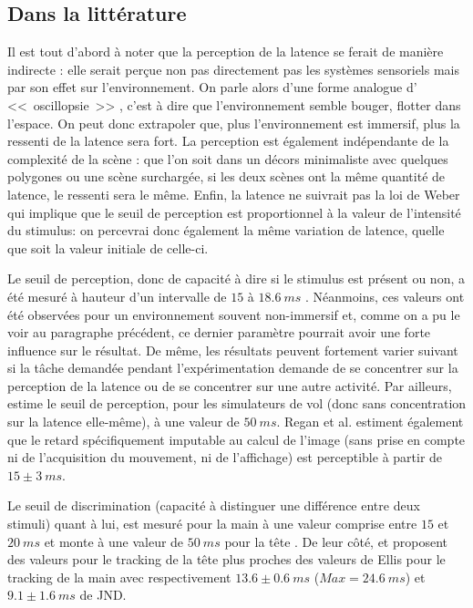 	\subsection{Dans la littérature}
	\par Il est tout d'abord à noter que la perception de la latence se ferait de manière indirecte \citep{adelstein_head_2003}: elle serait perçue non pas directement pas les systèmes sensoriels mais par son effet sur l'environnement. On parle alors d'une forme analogue d' <<~oscillopsie~>> \citep{allison_tolerance_2001}, c'est à dire que l'environnement semble bouger, flotter dans l'espace. On peut donc extrapoler que, plus l'environnement est immersif, plus la ressenti de la latence sera fort. La perception est également indépendante de la complexité de la scène \citep{mania_perceptual_2004}: que l'on soit dans un décors minimaliste avec quelques polygones ou une scène surchargée, si les deux scènes ont la même quantité de latence, le ressenti sera le même. Enfin, la latence ne suivrait pas la loi de Weber \citep{adelstein_head_2003} qui implique que le seuil de perception est proportionnel à la valeur de l'intensité du stimulus: on percevrai donc également la même variation de latence, quelle que soit la valeur initiale de celle-ci.
	
	\par Le seuil de perception, donc de capacité à dire si le stimulus est présent ou non, a été mesuré à hauteur d'un intervalle de $15$ à $18.6~ms$ \citep{regan_real-time_1999}. Néanmoins, ces valeurs ont été observées pour un environnement souvent non-immersif et, comme on a pu le voir au paragraphe précédent, ce dernier paramètre pourrait avoir une forte influence sur le résultat. De même, les résultats peuvent fortement varier suivant si la tâche demandée pendant l'expérimentation demande de se concentrer sur la perception de la latence ou de se concentrer sur une autre activité. Par ailleurs, \citep{brooks_whats_1999} estime le seuil de perception, pour les simulateurs de vol (donc sans concentration sur la latence elle-même), à une valeur de $50~ms$. Regan et al. estiment également que le retard spécifiquement imputable au calcul de l'image (sans prise en compte ni de l'acquisition du mouvement, ni de l'affichage) est perceptible à partir de $15 \pm 3~ms$.
	
	\par Le seuil de discrimination (capacité à distinguer une différence entre deux stimuli) quant à lui, est mesuré pour la main à une valeur comprise entre $15$ et $20~ms$ et monte à une valeur de $50~ms$ pour la tête \citep{ellis_sensor_1999}. De leur côté, \citep{adelstein_head_2003} et \citep{mania_perceptual_2004} proposent des valeurs pour le tracking de la tête plus proches des valeurs de Ellis pour le tracking de la main avec respectivement $13.6 \pm 0.6~ms$ ($Max = 24.6~ms$) et $9.1 \pm 1.6~ms$ de JND.
	
